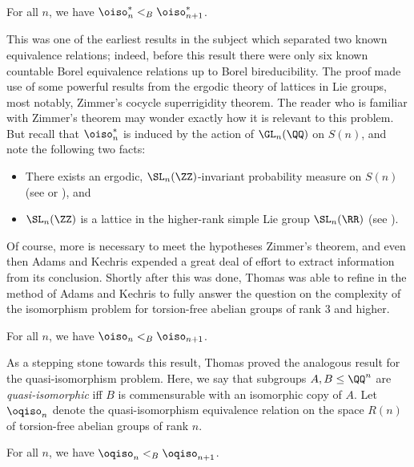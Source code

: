 \documentclass[oneside,leqno,11pt]{amsart}
\begin{document}
\begin{thm*}
  For all $n$, we have $\oiso_n^*<_B\oiso_{n+1}^*$.
\end{thm*}

This was one of the earliest results in the subject which separated
two known equivalence relations; indeed, before this result there were
only six known countable Borel equivalence relations up to Borel
bireducibility.  The proof made use of some powerful results from the
ergodic theory of lattices in Lie groups, most notably, Zimmer's
cocycle superrigidity theorem.  The reader who is familiar with
Zimmer's theorem may wonder exactly how it is relevant to this
problem.  But recall that $\oiso_n^*$ is induced by the action of
$\GL_n(\QQ)$ on $S(n)$, and note the following two facts:
\begin{itemize}
\item There exists an ergodic, $\SL_n(\ZZ)$-invariant probability
  measure on $S(n)$ (see \cite{hjorth} or
  \cite[Theorem~2.4]{thomas_survey}), and
\item $\SL_n(\ZZ)$ is a lattice in the higher-rank simple Lie group
  $\SL_n(\RR)$ (see \cite[Theorem~3.1.7]{zimmer}).
\end{itemize}
Of course, more is necessary to meet the hypotheses Zimmer's theorem,
and even then Adams and Kechris expended a great deal of effort to
extract information from its conclusion.  Shortly after this was done,
Thomas was able to refine in \cite{torsionfree} the method of Adams
and Kechris to fully answer the question on the complexity of the
isomorphism problem for torsion-free abelian groups of rank $3$ and
higher.

\begin{thm*}
  For all $n$, we have $\oiso_n<_B\oiso_{n+1}$.
\end{thm*}

As a stepping stone towards this result, Thomas proved the analogous
result for the quasi-isomorphism problem.  Here, we say that subgroups
$A,B\leq\QQ^n$ are \emph{quasi-isomorphic} iff $B$ is commensurable
with an isomorphic copy of $A$.  Let $\oqiso_n$ denote the
quasi-isomorphism equivalence relation on the space $R(n)$ of
torsion-free abelian groups of rank $n$.

\begin{thm*}
  For all $n$, we have $\oqiso_n<_B\oqiso_{n+1}$.
\end{thm*}
\end{document}
